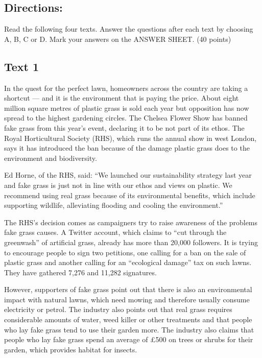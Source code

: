 \documentclass[UTF8,11pt]{ctexart}
\begin{document}
\subsection*{\textbf{Directions:}}


Read the following four texts. Answer the questions after each text by choosing A, B, C or D. Mark your answers on the ANSWER SHEET. (40 points)


\subsection*{\textbf{Text 1}}


In the quest for the perfect lawn, homeowners across the country are taking a shortcut — and it is the environment that is paying the price. About eight million square metres of plastic grass is sold each year but opposition has now spread to the highest gardening circles. The Chelsea Flower Show has banned fake grass from this year’s event, declaring it to be not part of its ethos. The Royal Horticultural Society (RHS), which runs the annual show in west London, says it has introduced the ban because of the damage plastic grass does to the environment and biodiversity.


Ed Horne, of the RHS, said: “We launched our sustainability strategy last year and fake grass is just not in line with our ethos and views on plastic. We recommend using real grass because of its environmental benefits, which include supporting wildlife, alleviating flooding and cooling the environment.”


The RHS’s decision comes as campaigners try to raise awareness of the problems fake grass causes. A Twitter account, which claims to “cut through the greenwash” of artificial grass, already has more than 20,000 followers. It is trying to encourage people to sign two petitions, one calling for a ban on the sale of plastic grass and another calling for an “ecological damage” tax on such lawns. They have gathered 7,276 and 11,282 signatures.


However, supporters of fake grass point out that there is also an environmental impact with natural lawns, which need mowing and therefore usually consume electricity or petrol. The industry also points out that real grass requires considerable amounts of water, weed killer or other treatments and that people who lay fake grass tend to use their garden more. The industry also claims that people who lay fake grass spend an average of £500 on trees or shrubs for their garden, which provides habitat for insects.
\end{document}
